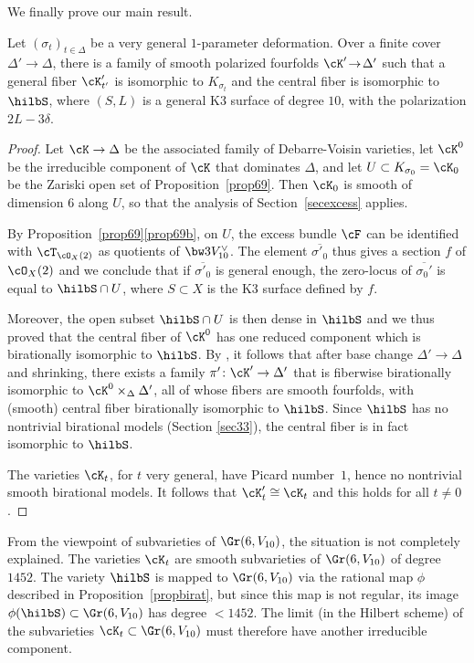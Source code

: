 We finally prove our main result.

\begin{theo} \label{theopourgenre6}
Let $(\sigma_t)_{t\in \Delta}$ be a very general $1$-parameter deformation.
Over a finite cover $\Delta'\!\to\!\Delta$, there is a family of smooth polarized \hk fourfolds
\hbox{$\cK'\!\to\!\Delta'$} such that a general fiber
$\cK'_{t'}$ is isomorphic to $K_{\sigma_t}$ and the central fiber
is isomorphic to
$\hilbS$, where $(S,L)$ is a general K3 surface of degree $10$, with the polarization $2L-3\delta$.
\end{theo}

\begin{proof} Let $ \cK\to \Delta$ be the associated family of Debarre-Voisin varieties, let $\cK^0$ be the irreducible component of $\cK$ that dominates $\Delta$, and let $U\subset K_{\sigma_0}=\cK_0$ be the Zariski open set of Proposition~\ref{prop69}. Then $ \cK_0$ is smooth of dimension $6$ along $U$, so that the analysis of Section~\ref{secexcess}
applies.

By Proposition~\ref{prop69}\eqref{prop69b}, on $U$, the excess bundle
$\cF$ can be identified with $\cT_{\cO_X(2)}$ as quotients of $\bw3V_{10}^\vee$. The element $\overline{\sigma'_0}$
thus gives a section
$f$ of $ \cO_X(2)$ and we conclude that if $\overline {\sigma'_0}$ is general enough, the zero-locus of $\overline {\sigma_0'}$
is equal to $\hilbS\cap U$, where
$S\subset X$ is the K3 surface defined by $f$.

Moreover, the open subset $\hilbS\cap U$ is then dense in $\hilbS$
and we thus proved that the central fiber of $\cK^0$ has one reduced component which is birationally isomorphic to $\hilbS$.
By \cite{KLSV}, it follows that after base change $\Delta'\to \Delta$ and shrinking, there exists a family
$\pi'\colon\cK'\to \Delta'$ that is fiberwise birationally isomorphic to $\cK^0\times_\Delta\Delta'$, all of whose fibers
are smooth \hk fourfolds, with (smooth) central fiber birationally isomorphic to $\hilbS$. Since $\hilbS$ has no nontrivial \hk birational models (Section \ref{sec33}), the central fiber is in fact isomorphic to $\hilbS$.

The varieties $\cK_t$, for $t$ very general, have Picard number~$1$, hence no nontrivial smooth \hk birational models. It follows that $\cK'_t\cong \cK_t$ and this holds for all $t\ne 0$.
\end{proof}

\begin{rema}
From the viewpoint of subvarieties of $\Gr(6,V_{10})$, the situation is not completely explained. The varieties
$\cK_t$ are smooth subvarieties of $\Gr(6,V_{10})$ of degree $1452$. The variety $\hilbS$ is mapped to $\Gr(6,V_{10})$ via
the rational map $\phi$ described in Proposition~\ref{propbirat}, but since this map
is not regular, its image $\phi(\hilbS)\subset \Gr(6,V_{10})$ has degree $<1452$. The limit (in the Hilbert scheme) of the subvarieties
$\cK_t\subset \Gr(6,V_{10})$ must therefore have another irreducible component.
\end{rema}

